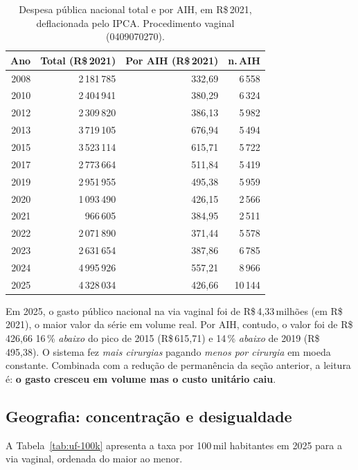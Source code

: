 \documentclass[12pt,a4paper,oneside]{article}
\newcommand{\rs}{R\$\,}
\begin{document}
\begin{table}[H]
\centering
\caption{Despesa pública nacional total e por AIH, em \rs 2021,
deflacionada pelo IPCA. Procedimento vaginal (0409070270).}
\label{tab:nat-val}
\small
\begin{tabular}{rrrr}
\toprule
\textbf{Ano} & \textbf{Total (R\$\,2021)} & \textbf{Por AIH (R\$\,2021)} & \textbf{n.\,AIH} \\
\midrule
2008 & 2\,181\,785 & 332{,}69 &  6\,558 \\
2010 & 2\,404\,941 & 380{,}29 &  6\,324 \\
2012 & 2\,309\,820 & 386{,}13 &  5\,982 \\
2013 & 3\,719\,105 & 676{,}94 &  5\,494 \\
2015 & 3\,523\,114 & 615{,}71 &  5\,722 \\
2017 & 2\,773\,664 & 511{,}84 &  5\,419 \\
2019 & 2\,951\,955 & 495{,}38 &  5\,959 \\
2020 & 1\,093\,490 & 426{,}15 &  2\,566 \\
2021 &   966\,605 & 384{,}95 &  2\,511 \\
2022 & 2\,071\,890 & 371{,}44 &  5\,578 \\
2023 & 2\,631\,654 & 387{,}86 &  6\,785 \\
2024 & 4\,995\,926 & 557{,}21 &  8\,966 \\
2025 & 4\,328\,034 & 426{,}66 & 10\,144 \\
\bottomrule
\end{tabular}
\end{table}

Em 2025, o gasto público nacional na via vaginal foi de
\rs 4{,}33\,milhões (em \rs 2021), o maior valor da série
em volume real. Por AIH, contudo, o valor foi de \rs 426{,}66
\textemdash{} 16\,\% \textit{abaixo} do pico de 2015
(\rs 615{,}71) e 14\,\% \textit{abaixo} de 2019 (\rs 495{,}38).
O sistema fez \textit{mais cirurgias} pagando \textit{menos por
cirurgia} em moeda constante. Combinada com a redução de
permanência da seção anterior, a leitura é:
\textbf{o gasto cresceu em volume mas o custo unitário caiu}.

\subsection{Geografia: concentração e desigualdade}\label{sub:geografia}

A Tabela~\ref{tab:uf-100k} apresenta a taxa por 100\,mil habitantes
em 2025 para a via vaginal, ordenada do maior ao menor.
\end{document}
